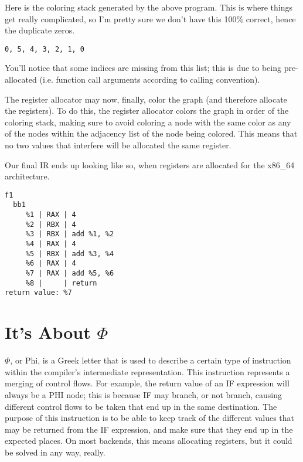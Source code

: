 \documentclass[
12pt,
letterpaper,
oneside,
]{memoir}
\begin{document}
Here is the coloring stack generated by the above program. This is where things get really complicated, so I'm pretty sure we don't have this 100\% correct, hence the duplicate zeros.

\begin{verbatim}
0, 5, 4, 3, 2, 1, 0
\end{verbatim}

You'll notice that some indices are missing from this list; this is due to being pre-allocated (i.e. function call arguments according to calling convention).

The register allocator may now, finally, color the graph (and therefore allocate the registers). To do this, the register allocator colors the graph in order of the coloring stack, making sure to avoid coloring a node with the same color as any of the nodes within the adjacency list of the node being colored. This means that no two values that interfere will be allocated the same register.

Our final IR ends up looking like so, when registers are allocated for the x86\_64 architecture.

\begin{verbatim}
f1
  bb1
     %1 | RAX | 4
     %2 | RBX | 4
     %3 | RBX | add %1, %2
     %4 | RAX | 4
     %5 | RBX | add %3, %4
     %6 | RAX | 4
     %7 | RAX | add %5, %6
     %8 |     | return
return value: %7
\end{verbatim}

\section{It's About $\Phi$}

$\Phi$, or Phi, is a Greek letter that is used to describe a certain type of instruction within the compiler's intermediate representation. This instruction represents a merging of control flows. For example, the return value of an IF expression will always be a PHI node; this is because IF may branch, or not branch, causing different control flows to be taken that end up in the same destination. The purpose of this instruction is to be able to keep track of the different values that may be returned from the IF expression, and make sure that they end up in the expected places. On most backends, this means allocating registers, but it could be solved in any way, really.
\end{document}
